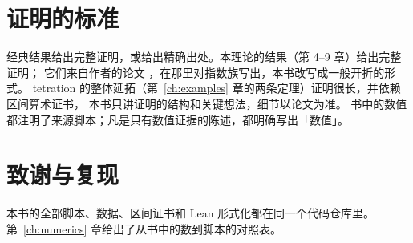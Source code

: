 \section*{证明的标准}

经典结果给出完整证明，或给出精确出处。本理论的结果（第 4--9 章）给出完整证明；
它们来自作者的论文 \cite{KneserPaper}，在那里对指数族写出，本书改写成一般开折的形式。
tetration 的整体延拓（第~\ref{ch:examples} 章的两条定理）证明很长，并依赖区间算术证书，
本书只讲证明的结构和关键想法，细节以论文为准。
书中的数值都注明了来源脚本；凡是只有数值证据的陈述，都明确写出「数值」。

\section*{致谢与复现}

本书的全部脚本、数据、区间证书和 Lean 形式化都在同一个代码仓库里。
第~\ref{ch:numerics} 章给出了从书中的数到脚本的对照表。
